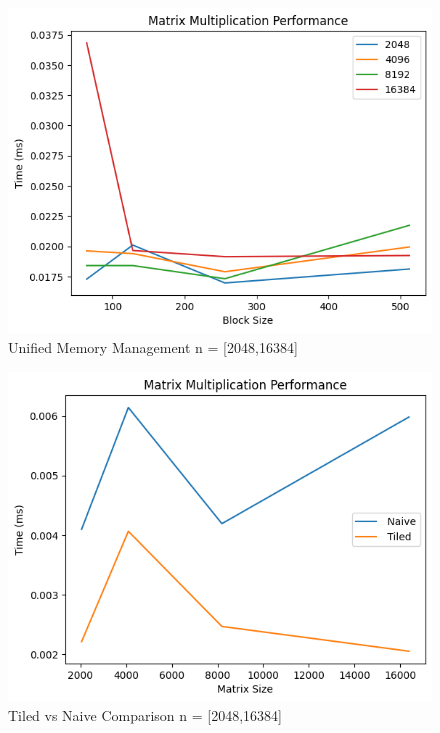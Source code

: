 \documentclass[12p,english]{article}
\begin{document}
\begin{figure}[H]
\centering
\includegraphics[scale= 0.6]{UnifiedL.png}
\caption{Unified Memory Management n = [2048,16384]}
\end{figure}

\begin{figure}[H]
\centering
\includegraphics[scale= 0.6]{TiledL.png}
\caption{Tiled vs Naive Comparison n = [2048,16384]}
\end{figure}
\end{document}
